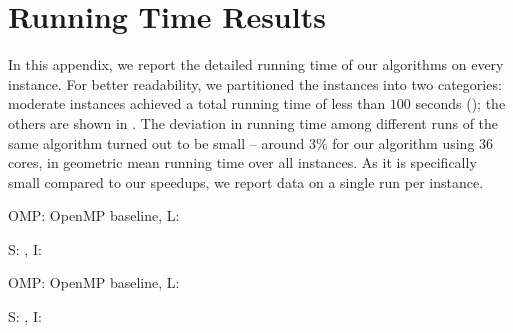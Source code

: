 
\section{Running Time Results}
\label{apx:betw-apx:time}
%
In this appendix, we report the detailed running time of our algorithms on
every instance. For better readability, we partitioned the instances into two
categories: moderate instances achieved a total running time of less than $100$
seconds (); the others are shown in
. The deviation in running time among
different runs of the same algorithm turned out to be small -- \eg around $3\%$
for our \localframe algorithm using $36$ cores, in geometric mean running time
over all instances. As it is specifically small compared to our speedups, we
report data on a single run per instance.


\begin{table}[h]
\setlength{\tabcolsep}{3pt}
\centering\scriptsize
{}
\label{tab:betw-apx:time-moderate}

\begin{subtable}[t]{\textwidth}
\centering
\caption{OMP: OpenMP baseline, L: \localframe}

\end{subtable}\bigskip

\begin{subtable}[t]{\textwidth}
\centering
\caption{S: \sharedframe, I: \indexedframe}

\end{subtable}
\end{table}

\begin{table}[h]
\setlength{\tabcolsep}{3pt}
\centering\scriptsize
{}
\label{tab:betw-apx:time-expensive}

\begin{subtable}[t]{\textwidth}
\centering
\caption{OMP: OpenMP baseline, L: \localframe}

\end{subtable}\bigskip

\begin{subtable}[t]{\textwidth}
\centering
\caption{S: \sharedframe, I: \indexedframe}

\end{subtable}
\end{table}


